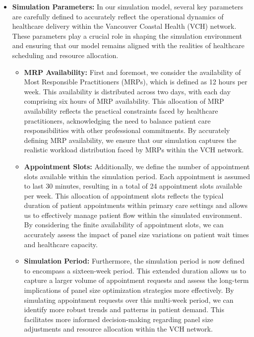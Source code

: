 \documentclass[11pt]{article}
\theoremstyle{definition}
\begin{document}
\begin{itemize}
    \item \textbf{Simulation Parameters:} In our simulation model, several key parameters are carefully defined to accurately reflect the operational dynamics of healthcare delivery within the Vancouver Coastal Health (VCH) network. These parameters play a crucial role in shaping the simulation environment and ensuring that our model remains aligned with the realities of healthcare scheduling and resource allocation.
    
    \begin{itemize}
    \item \textbf{MRP Availability:} First and foremost, we consider the availability of Most Responsible Practitioners (MRPs), which is defined as 12 hours per week. This availability is distributed across two days, with each day comprising six hours of MRP availability. This allocation of MRP availability reflects the practical constraints faced by healthcare practitioners, acknowledging the need to balance patient care responsibilities with other professional commitments. By accurately defining MRP availability, we ensure that our simulation captures the realistic workload distribution faced by MRPs within the VCH network.
    \item \textbf{Appointment Slots:} Additionally, we define the number of appointment slots available within the simulation period. Each appointment is assumed to last 30 minutes, resulting in a total of 24 appointment slots available per week. This allocation of appointment slots reflects the typical duration of patient appointments within primary care settings and allows us to effectively manage patient flow within the simulated environment. By considering the finite availability of appointment slots, we can accurately assess the impact of panel size variations on patient wait times and healthcare capacity.
    \item \textbf {Simulation Period:} Furthermore, the simulation period is now defined to encompass a sixteen-week period. This extended duration allows us to capture a larger volume of appointment requests and assess the long-term implications of panel size optimization strategies more effectively. By simulating appointment requests over this multi-week period, we can identify more robust trends and patterns in patient demand. This facilitates more informed decision-making regarding panel size adjustments and resource allocation within the VCH network.
    \end{itemize}
\end{itemize}
\end{document}
